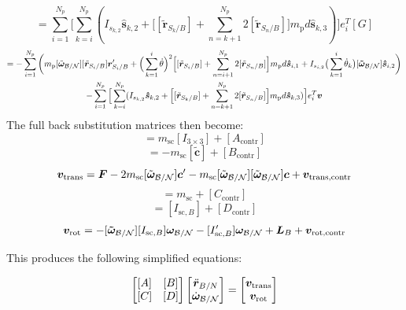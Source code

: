 \documentclass[paper]{aiaaNew}
\begin{document}
\begin{equation}
[D_{\text{contr}}] = \sum\limits_{i=1}^{N_p} \Big[\sum^{N_p}_{k=i} (I_{s_{k,2}} \bm{\hat{s}}_{k,2} + \Big[ [\tilde{{\bm r}}_{S_{k}/B}] + \sum\limits_{n=k+1}^{N_p}2[\tilde{{\bm r}}_{S_{n}/B}]\Big]m_{\text{p}} d \bm{\hat{s}}_{k,3} )\Big] e_{i}^T[G]
\end{equation}
\begin{multline}
[v_{\text{rot,contr}}] = - \sum\limits_{i=1}^{N_p}\bigg( m_{\text{p}} [\tilde{\bm\omega}_{\cal B/N}] [\tilde{{\bm r}}_{S_{i}/B}] \bm{r}'_{S_i/B} + \Big( \sum\limits_{k=1}^{i} \dot{\theta}\Big)^2 \Big[[\tilde{{\bm r}}_{S_{i}/B}] + \sum\limits_{n=i+1}^{N_p}2[\tilde{{\bm r}}_{S_{n}/B}]\Big] m_{\text{p}} d \bm{\hat{s}}_{i,1}
+ I_{s_{i,2}} \big(\sum^{i}_{k=1}\dot{\theta}_k\big) [\bm{\tilde{\omega}}_{\cal B/N}] \bm{\hat{s}}_{i,2} \bigg) \\
- \sum\limits_{i=1}^{N_p} \Big[\sum^{N_p}_{k=i} (I_{s_{k,2}} \bm{\hat{s}}_{k,2} + \Big[ [\tilde{{\bm r}}_{S_{k}/B}] + \sum\limits_{n=k+1}^{N_p}2[\tilde{{\bm r}}_{S_{n}/B}]\Big]m_{\text{p}} d \bm{\hat{s}}_{k,3} )\Big]  e_{i}^T \bm v 
\end{multline}
The full back substitution matrices then become:
\begin{equation}
[A]  = m_\text{sc} [I_{3\times 3}] + [A_{\text{contr}}]
\end{equation}\begin{equation}
[B] = -m_\text{sc} [\tilde{\bm{c}}] + [B_{\text{contr}}]
\end{equation}\begin{equation}
\bm v_{\text{trans}} = \bm F - 2m_\text{sc} [\tilde{\bm\omega}_{\cal B/N}] \bm c'- m_\text{sc} [\tilde{\bm\omega}_{\cal B/N}][\tilde{\bm\omega}_{\cal B/N}]\bm{c} + \bm v_{\text{trans,contr}}
\end{equation}\begin{equation}
[C] = m_{\text{sc}} + [C_{\text{contr}}]
\end{equation}\begin{equation}
[D] =  [I_{\text{sc},B}] + [D_{\text{contr}}]
\end{equation}\begin{equation}
\bm v_{\text{rot}} = -[\bm{\tilde{\omega}}_{\cal B/N}] [I_{\text{sc},B}] \bm\omega_{\cal B/N} - [I'_{\text{sc},B}] \bm\omega_{\cal B/N} + \bm{L}_B + \bm v_{\text{rot,contr}}
\end{equation}


This produces the following simplified equations:

	\begin{equation}
\begin{bmatrix}
[A] & [B]\\
[C] & [D]
\end{bmatrix} \begin{bmatrix}
\ddot{\bm r}_{B/N}\\
\dot{\bm\omega}_{\cal B/N}
\end{bmatrix} = \begin{bmatrix}
\bm v_{\text{trans}}\\
\bm v_{\text{rot}}
\end{bmatrix}
\end{equation}
\end{document}
